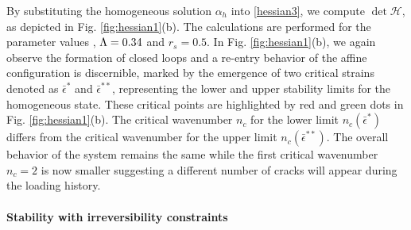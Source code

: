 By substituting the homogeneous solution $\alpha_h$ into \eqref{hessian3}, we compute $\det \mathcal{H}$, as depicted  in Fig. \ref{fig:hessian1}(b). The calculations are performed for the parameter values , $\Lambda=0.34$ and $r_s=0.5$.  In Fig. \ref{fig:hessian1}(b), we again observe the formation of closed loops and a re-entry behavior of the affine configuration is discernible, marked by the emergence of two critical strains denoted as $\bar\epsilon^*$ and $\bar\epsilon^{**}$, representing the lower and upper stability limits for the homogeneous state. These critical points are highlighted by red and green dots in Fig. \ref{fig:hessian1}(b). The critical wavenumber $n_c$ for the lower limit $n_c(\bar{\epsilon}^*)$    differs from the critical wavenumber for the upper limit $n_c(\bar{\epsilon}^{**})$. The overall behavior of the system remains the same while the first critical wavenumber $n_c=2$ is now smaller suggesting a different number of cracks will appear during the loading history.




% 

\paragraph{Stability with irreversibility constraints}

